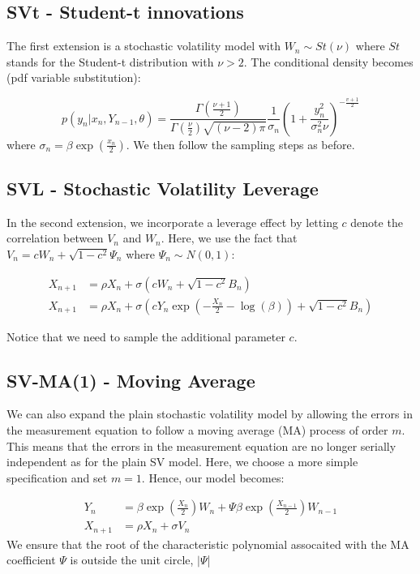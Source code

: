 \documentclass[11pt,a4,twosided,singlespacing,titlepagenumber=on]{scrreprt}
\numberwithin{equation}{chapter} %
\theoremstyle{remark}
\begin{document}
\subsection{SVt - Student-t innovations}
The first extension is a stochastic volatility model with ${W_n} \sim St(\nu)$ where $St$ stands for the Student-t distribution with $\nu > 2$. The conditional density becomes (pdf variable substitution):

$$p(y_n | x_n, Y_{n-1},  \theta) = \frac{\Gamma(\frac{\nu+1}{2})}{\Gamma(\frac{\nu}{2}) \sqrt{(\nu-2)\pi}} \frac{1}{\sigma_n}\left( 1 + \frac{y_n^2}{\sigma_n^2 \nu}\right)^{-\frac{v+1}{2}}$$
where $\sigma_n = \beta \exp \left(\frac{x_n}{2} \right)$. We then follow the sampling steps as before.

\subsection{SVL - Stochastic Volatility Leverage}
In the second extension, we incorporate a leverage effect by letting $c$ denote the correlation between $V_n$ and $W_n$. Here, we use the fact that $V_n = c W_n + \sqrt{1-c^2} \Psi_n$ where $\Psi_n \sim N(0,1) :$

\begin{align*}
X_{n+1} &=  \rho X_{n} + \sigma \left(c W_n + \sqrt{1-c^2} B_n \right) \\
X_{n+1} &=  \rho X_{n} + \sigma \left(c Y_n \exp \left( - \frac{X_n}{2} - \log(\beta) \right)  + \sqrt{1-c^2} B_n \right)
\end{align*}

Notice that we need to sample the additional parameter $c$.

\subsection{SV-MA(1) - Moving Average}
We can also expand the plain stochastic volatility model by allowing the errors in the measurement equation to follow a moving average (MA) process of order $m$. This means that the errors in the measurement equation are no longer serially independent as for the plain SV model. Here, we choose a more simple specification and set $m = 1$. Hence, our model becomes:

\begin{align*}
Y_n &=  \beta \exp \left( \frac{X_n}{2} \right) W_n + \Psi \beta \exp \left( \frac{X_{n-1}}{2} \right) W_{n-1} \\
X_{n+1} &=  \rho X_{n} + \sigma V_n
\end{align*}
We ensure that the root of the characteristic polynomial assocaited with the MA coefficient $\Psi$ is outside the unit circle, $|\Psi$| \\
\end{document}
